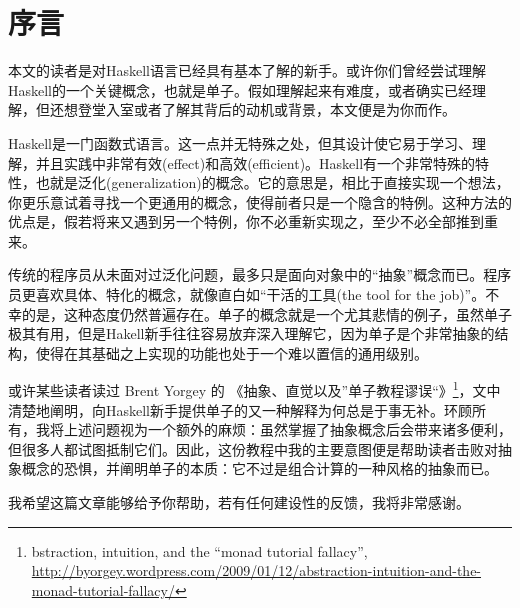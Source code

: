 \section{序言}

本文的读者是对Haskell语言已经具有基本了解的新手。或许你们曾经尝试理解Haskell的一个关键概念，也就是单子。假如理解起来有难度，或者确实已经理解，但还想登堂入室或者了解其背后的动机或背景，本文便是为你而作。

Haskell是一门函数式语言。这一点并无特殊之处，但其设计使它易于学习、理解，并且实践中非常有效(effect)和高效(efficient)。Haskell有一个非常特殊的特性，也就是泛化(generalization)的概念。它的意思是，相比于直接实现一个想法，你更乐意试着寻找一个更通用的概念，使得前者只是一个隐含的特例。这种方法的优点是，假若将来又遇到另一个特例，你不必重新实现之，至少不必全部推到重来。

传统的程序员从未面对过泛化问题，最多只是面向对象中的“抽象”概念而已。程序员更喜欢具体、特化的概念，就像直白如“干活的工具(the tool for the job)”。不幸的是，这种态度仍然普遍存在。单子的概念就是一个尤其悲情的例子，虽然单子极其有用，但是Hakell新手往往容易放弃深入理解它，因为单子是个非常抽象的结构，使得在其基础之上实现的功能也处于一个难以置信的通用级别。

或许某些读者读过 Brent Yorgey 的 《抽象、直觉以及”单子教程谬误“》\footnote{bstraction, intuition, and the ``monad tutorial fallacy'', \url{http://byorgey.wordpress.com/2009/01/12/abstraction-intuition-and-the-monad-tutorial-fallacy/}}，文中清楚地阐明，向Haskell新手提供单子的又一种解释为何总是于事无补。环顾所有，我将上述问题视为一个额外的麻烦：虽然掌握了抽象概念后会带来诸多便利，但很多人都试图抵制它们。因此，这份教程中我的主要意图便是帮助读者击败对抽象概念的恐惧，并阐明单子的本质：它不过是组合计算的一种风格的抽象而已。

我希望这篇文章能够给予你帮助，若有任何建设性的反馈，我将非常感谢。